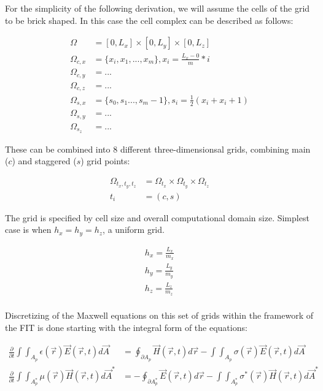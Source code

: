             For the simplicity of the following derivation\cite{rahimi2011finite}, we will assume the cells of the grid to be brick shaped. In this
            case the cell complex can be described as follows:

            \begin{align}
                \Omega &= [0, L_x]\times[0, L_y]\times[0, L_z] \\
                \Omega_{c,x} &= \{x_i, x_1, ..., x_m\}, x_i = \frac{L_x - 0}{m}*i \\
                \Omega_{c,y} &= ... \\
                \Omega_{c,z} &= ... \\
                \Omega_{s,x} &= \{s_0, s_1 ..., s_m-1\}, s_i = \frac{1}{2}(x_i + x_i+1) \\
                \Omega_{s,y} &= ... \\
                \Omega_{s_z} &= ...
            \end{align}

            These can be combined into 8 different three-dimensionsal grids, combining main ($c$) and staggered ($s$) grid points:

            \begin{align}
                \Omega_{t_x, t_y, t_z} &= \Omega_{t_x}\times\Omega_{t_y}\times\Omega_{t_z}\\
                t_i &= (c, s)
            \end{align}

            The grid is specified by cell size and overall computational domain size.
            Simplest case is when $h_x = h_y = h_z$, a uniform grid.

            \begin{align}
                h_x = \frac{L_x}{m_x} \\
                h_y = \frac{L_y}{m_y} \\
                h_z = \frac{L_z}{m_z} \\
            \end{align}

            Discretizing of the Maxwell equations on this set of grids within the framework of the
            FIT is done starting with the integral form of the equations:

            \begin{align}
                \frac{\partial}{\partial t}\int\int_{A_p} \epsilon(\vec{r})\vec{E}(\vec{r},t)d\vec{A}
                    &= \oint_{\partial A_p} \vec{H}(\vec{r}, t)d\vec{r} - \int\int_{A_p}\sigma(\vec{r})\vec{E}(\vec{r}, t)d\vec{A} \\
                \frac{\partial}{\partial t}\int\int_{A_p^*} \mu(\vec{r})\vec{H}(\vec{r}, t)d\vec{A}^*
                    &= -\oint_{\partial A_p^*} \vec{E}(\vec{r},t)d\vec{r} - \int\int_{A_p^*}\sigma^*(\vec{r})\vec{H}(\vec{r},t)d\vec{A}^*\\
            \end{align}

